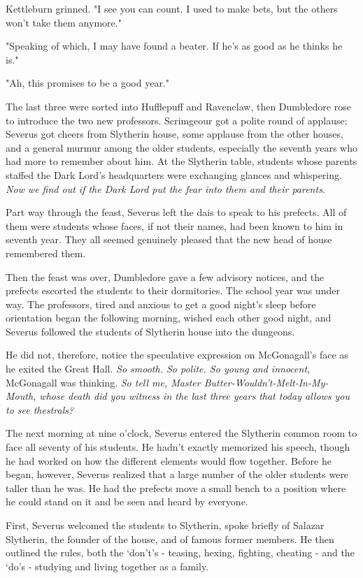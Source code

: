 Kettleburn grinned. "I see you can count. I used to make bets, but the others won't take them anymore."

"Speaking of which, I may have found a beater. If he's as good as he thinks he is."

"Ah, this promises to be a good year."

The last three were sorted into Hufflepuff and Ravenclaw, then Dumbledore rose to introduce the two new professors. Scrimgeour got a polite round of applause; Severus got cheers from Slytherin house, some applause from the other houses, and a general murmur among the older students, especially the seventh years who had more to remember about him. At the Slytherin table, students whose parents staffed the Dark Lord's headquarters were exchanging glances and whispering. \emph{Now we find out if the Dark Lord put the fear into them and their parents.}

Part way through the feast, Severus left the dais to speak to his prefects. All of them were students whose faces, if not their names, had been known to him in seventh year. They all seemed genuinely pleased that the new head of house remembered them.

Then the feast was over, Dumbledore gave a few advisory notices, and the prefects escorted the students to their dormitories. The school year was under way. The professors, tired and anxious to get a good night's sleep before orientation began the following morning, wished each other good night, and Severus followed the students of Slytherin house into the dungeons.

He did not, therefore, notice the speculative expression on McGonagall's face as he exited the Great Hall. \emph{So smooth. So polite. So young and innocent,} McGonagall was thinking. \emph{So tell me, Master Butter-Wouldn't-Melt-In-My-Mouth, whose death did you witness in the last three years that today allows you to see thestrals?}

The next morning at nine o'clock, Severus entered the Slytherin common room to face all seventy of his students. He hadn't exactly memorized his speech, though he had worked on how the different elements would flow together. Before he began, however, Severus realized that a large number of the older students were taller than he was. He had the prefects move a small bench to a position where he could stand on it and be seen and heard by everyone.

First, Severus welcomed the students to Slytherin, spoke briefly of Salazar Slytherin, the founder of the house, and of famous former members. He then outlined the rules, both the `don't's - teasing, hexing, fighting, cheating - and the `do's - studying and living together as a family.

